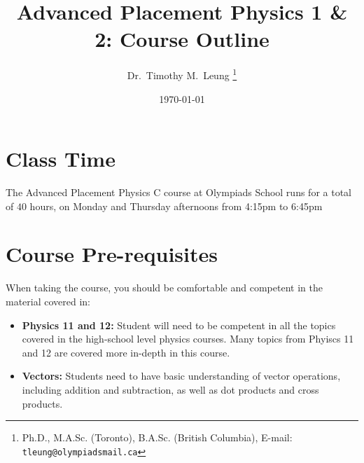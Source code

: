 \documentclass{../../oss-handout}
\title{Advanced Placement Physics 1 \& 2: Course Outline}
\author{Dr.\ Timothy M.\ Leung
  \footnote{Ph.D., M.A.Sc. (Toronto), B.A.Sc. (British Columbia), E-mail:
    \texttt{tleung@olympiadsmail.ca}}
}
\date{\today}
\begin{document}
\thispagestyle{title}
\gentitle

\section*{Class Time}
The Advanced Placement Physics C course at Olympiads School runs for a total of
$40$ hours, on Monday and Thursday afternoons from 4:15pm to 6:45pm


\section*{Course Pre-requisites}
When taking the course, you should be comfortable and competent in the material
covered in:
\begin{itemize}[noitemsep,topsep=0pt,leftmargin=18pt]
\item\textbf{Physics 11 and 12:} Student will need to be competent in all the
  topics covered in the high-school level physics courses. Many topics from
  Phyiscs 11 and 12 are covered more in-depth in this course.
\item\textbf{Vectors:} Students need to have basic understanding of vector
  operations, including addition and subtraction, as well as dot products and
  cross products.
\end{itemize}
\end{document}
